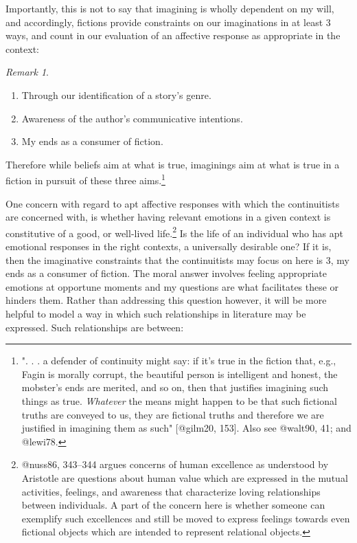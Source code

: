 \documentclass[
  letterpaper,
  DIV=11,
  numbers=noendperiod]{scrartcl}
\providecommand{\tightlist}{%
  \setlength{\itemsep}{0pt}\setlength{\parskip}{0pt}}
\theoremstyle{remark}
\newtheorem*{remark}{Remark}
\begin{document}
Importantly, this is not to say that imagining is wholly dependent on my
will, and accordingly, fictions provide constraints on our imaginations
in at least 3 ways, and count in our evaluation of an affective response
as appropriate in the context:

\begin{remark}
\leavevmode

\begin{enumerate}
\def\labelenumi{\arabic{enumi}.}
\tightlist
\item
  Through our identification of a story's genre.
\item
  Awareness of the author's communicative intentions.
\item
  My ends as a consumer of fiction.
\end{enumerate}

\end{remark}

\noindent Therefore while beliefs aim at what is true, imaginings aim at
what is true in a fiction in pursuit of these three aims.\footnote{". .
  . a defender of continuity might say: if it's true in the fiction
  that, e.g., Fagin is morally corrupt, the beautiful person is
  intelligent and honest, the mobster's ends are merited, and so on,
  then that justifies imagining such things as true. \emph{Whatever} the
  means might happen to be that such fictional truths are conveyed to
  us, they are fictional truths and therefore we are justified in
  imagining them as such" {[}@gilm20, 153{]}. Also see @walt90, 41; and
  @lewi78.}

One concern with regard to apt affective responses with which the
continuitists are concerned with, is whether having relevant emotions in
a given context is constitutive of a good, or well-lived
life.\footnote{@nuss86, 343--344 argues concerns of human excellence as
  understood by Aristotle are questions about human value which are
  expressed in the mutual activities, feelings, and awareness that
  characterize loving relationships between individuals. A part of the
  concern here is whether someone can exemplify such excellences and
  still be moved to express feelings towards even fictional objects
  which are intended to represent relational objects.} Is the life of an
individual who has apt emotional responses in the right contexts, a
universally desirable one? If it is, then the imaginative constraints
that the continuitists may focus on here is 3, my ends as a consumer of
fiction. The moral answer involves feeling appropriate emotions at
opportune moments and my questions are what facilitates these or hinders
them. Rather than addressing this question however, it will be more
helpful to model a way in which such relationships in literature may be
expressed. Such relationships are between:
\end{document}

